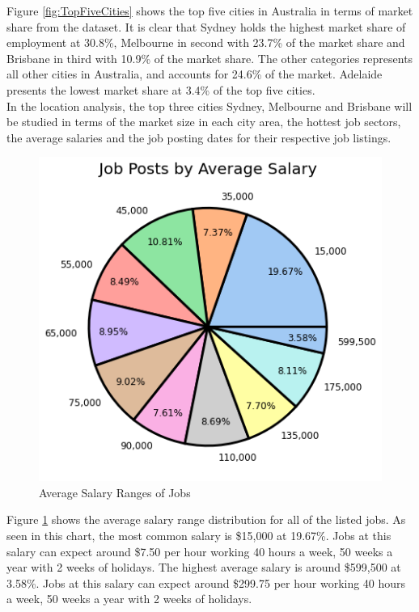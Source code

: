 \documentclass[twoside, 12pt, a4paper]{article}
\begin{document}
Figure \ref{fig:TopFiveCities} shows the top five cities in Australia in terms of market share from the dataset. It is clear that Sydney holds the highest market share of employment at 30.8\%, Melbourne in second with 23.7\% of the market share and Brisbane in third with 10.9\% of the market share. The other categories represents all other cities in Australia, and accounts for 24.6\% of the market. Adelaide presents the lowest market share at 3.4\% of the top five cities.\\
In the location analysis, the top three cities Sydney, Melbourne and Brisbane will be studied in terms of the market size in each city area, the hottest job sectors, the average salaries and the job posting dates for their respective job listings. 
\newpage
\begin{figure}[h]
	\centering
	\includegraphics[scale = 0.55]{AverageRanges.png}
	\caption{Average Salary Ranges of Jobs}
	\label{fig:AverageRanges}
\end{figure}

Figure \ref{fig:AverageRanges} shows the average salary range distribution for all of the listed jobs. As seen in this chart, the most common salary is \$15,000 at 19.67\%. Jobs at this salary can expect around \$7.50 per hour working 40 hours a week, 50 weeks a year with 2 weeks of holidays. The highest average salary is around \$599,500 at 3.58\%. Jobs at this salary can expect around \$299.75 per hour working 40 hours a week, 50 weeks a year with 2 weeks of holidays. 
\end{document}
